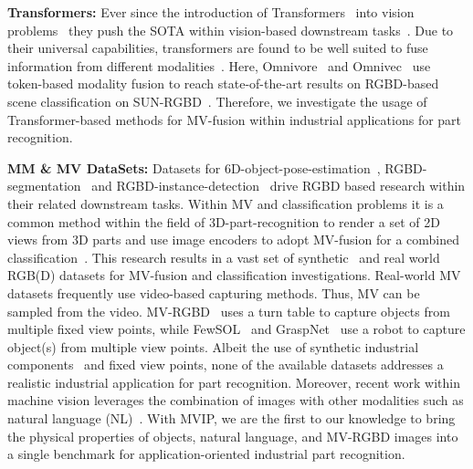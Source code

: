 \textbf{Transformers:} Ever since the introduction of Transformers~\cite{AttentionIsAll} into vision problems~\cite{ImageTransformers} they push the SOTA within vision-based downstream tasks~\cite{Swin,Swinv2,Detr,Deformable-Detr,Dino,segformer}. Due to their universal capabilities, transformers are found to be well suited to fuse information from different modalities~\cite{Clip,stable-diffusion,Tokenfusion,CMX-rgbdfusion,omnivore,omnivec,omnivec2}. Here, Omnivore~\cite{omnivore} and Omnivec~\cite{omnivec,omnivec2} use token-based modality fusion to reach state-of-the-art results on RGBD-based scene classification on SUN-RGBD~\cite{RGBD-SUN}. Therefore, we investigate the usage of Transformer-based methods for MV-fusion within industrial applications for part recognition. 

\textbf{MM \& MV DataSets:} Datasets for 6D-object-pose-estimation~\cite{PoseCNN,LineMod,t-less,GraspNet}, RGBD-segmentation~\cite{RGBD-SUN,RGBD-NYUv2,RGBD-ScanNet,kitti} and RGBD-instance-detection~\cite{PoseCNN,kitti,GraspNet,LineMod} drive RGBD based research within their related downstream tasks. Within MV and classification problems it is a common method within the field of 3D-part-recognition to render a set of 2D views from 3D parts and use image encoders to adopt MV-fusion for a combined classification~\cite{mvcnn,View-GCN,MVTN,GVCNN,GIFT,MVFusionNet,RotationNet,MLVCNN}. This research results in a vast set of synthetic~\cite{synt_ABC,synt_MCB,synt_modelnet,synt_partnet,synt_shapenet} and real world~\cite{real_CO3D,real_PASCAL3D+,real_video_amt,real_video_freiburgcars,real_video_GoogleScanned,real_video_MV-RGBD2011,real_video_objectron,real_video_scanobject} RGB(D) datasets for MV-fusion and classification investigations. Real-world MV datasets frequently use video-based capturing methods. Thus, MV can be sampled from the video. MV-RGBD~\cite{real_video_MV-RGBD2011} uses a turn table to capture objects from multiple fixed view points, while FewSOL~\cite{real_fewShot} and GraspNet~\cite{GraspNet} use a robot to capture object(s) from multiple view points. Albeit the use of synthetic industrial components~\cite{synt_ABC,synt_MCB} and fixed view points, none of the available datasets addresses a realistic industrial application for part recognition. Moreover, recent work within machine vision leverages the combination of images with other modalities such as natural language (NL)~\cite{Clip,stable-diffusion}. With MVIP, we are the first to our knowledge to bring the physical properties of objects, natural language, and MV-RGBD images into a single benchmark for application-oriented industrial part recognition.